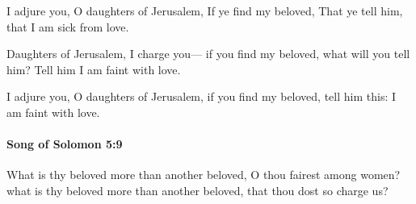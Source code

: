 			\begin{versebox}
					\item[BHS] 
					\item[LXX] 
					\item[ASV] I adjure you, O daughters of Jerusalem, If ye find my beloved, That ye tell him, that I am sick from love.
					\item[NIV] Daughters of Jerusalem, I charge you— if you find my beloved, what will you tell him? Tell him I am faint with love.
					\item[NRSV] I adjure you, O daughters of Jerusalem, if you find my beloved, tell him this: I am faint with love.
			\end{versebox}

		\paragraph{Song of Solomon 5:9} %
			\label{SONGOFSOLOMON-5-9}

			What is thy beloved more than another beloved, O thou fairest among women? what is thy beloved more than another beloved, that thou dost so charge us?


